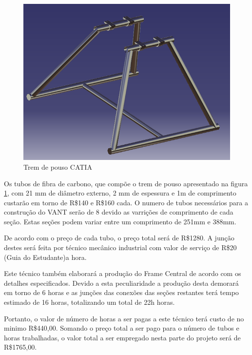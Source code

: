 \begin{figure}[H]
    \centering
      \includegraphics[keepaspectratio=true,scale=0.5]{figuras/frame_central.png}
    \caption{Trem de pouso CATIA}
    \label{fig:frame_central}
\end{figure}

Os tubos de fibra de carbono, que compõe o trem de pouso apresentado na figura \ref{fig:frame_central},
com 21 mm de diâmetro externo, 2 mm de espessura e 1m de comprimento custarão em torno de
R\$140 e R\$160 cada. O numero de tubos necessários para a construção do VANT serão de 8 devido
as varrições de comprimento de cada seção. Estas seções podem variar entre um comprimento de
251mm e 388mm.

De acordo com o preço de cada tubo, o preço total será de R\$1280. A junção destes será feita
por técnico mecânico industrial com valor de serviço de R\$20 (Guia do Estudante)\footnotemark a hora.


Este técnico também elaborará a produção do Frame Central de acordo com os detalhes
especificados. Devido a esta peculiaridade a produção desta demorará em torno de 6 horas e as
junções das conexões das seções restantes terá tempo estimado de 16 horas, totalizando um total de
22h horas.

Portanto, o valor de número de horas a ser pagas a este técnico terá custo de no minimo
R\$440,00. Somando o preço total a ser pago para o número de tubos e horas trabalhadas, o valor total
a ser empregado nesta parte do projeto será de R\$1765,00.

